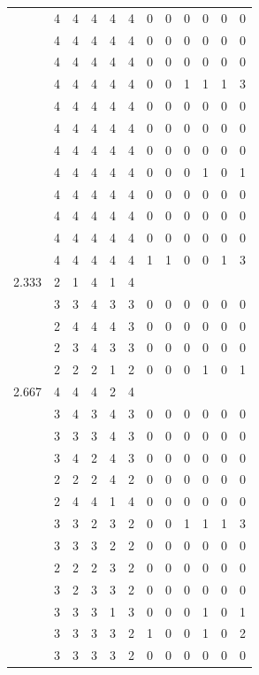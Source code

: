 \documentclass[]{msu-thesis}
\theoremstyle{definition}
\theoremstyle{definition}
\theoremstyle{definition}
\theoremstyle{remark}
\begin{document}
\begin{table}
{\begin{tabular}[t]{rrrrrrrrrrrr}
 & 4 & 4 & 4 & 4 & 4 & 0 & 0 & 0 & 0 & 0 & 0\\
 & 4 & 4 & 4 & 4 & 4 & 0 & 0 & 0 & 0 & 0 & 0\\
 & 4 & 4 & 4 & 4 & 4 & 0 & 0 & 0 & 0 & 0 & 0\\
 & 4 & 4 & 4 & 4 & 4 & 0 & 0 & 1 & 1 & 1 & 3\\
 & 4 & 4 & 4 & 4 & 4 & 0 & 0 & 0 & 0 & 0 & 0\\
 & 4 & 4 & 4 & 4 & 4 & 0 & 0 & 0 & 0 & 0 & 0\\
 & 4 & 4 & 4 & 4 & 4 & 0 & 0 & 0 & 0 & 0 & 0\\
 & 4 & 4 & 4 & 4 & 4 & 0 & 0 & 0 & 1 & 0 & 1\\
 & 4 & 4 & 4 & 4 & 4 & 0 & 0 & 0 & 0 & 0 & 0\\
 & 4 & 4 & 4 & 4 & 4 & 0 & 0 & 0 & 0 & 0 & 0\\
 & 4 & 4 & 4 & 4 & 4 & 0 & 0 & 0 & 0 & 0 & 0\\
 & 4 & 4 & 4 & 4 & 4 & 1 & 1 & 0 & 0 & 1 & 3\\
2.333 & 2 & 1 & 4 & 1 & 4 &  &  &  &  &  & \\
 & 3 & 3 & 4 & 3 & 3 & 0 & 0 & 0 & 0 & 0 & 0\\
 & 2 & 4 & 4 & 4 & 3 & 0 & 0 & 0 & 0 & 0 & 0\\
 & 2 & 3 & 4 & 3 & 3 & 0 & 0 & 0 & 0 & 0 & 0\\
 & 2 & 2 & 2 & 1 & 2 & 0 & 0 & 0 & 1 & 0 & 1\\
2.667 & 4 & 4 & 4 & 2 & 4 &  &  &  &  &  & \\
 & 3 & 4 & 3 & 4 & 3 & 0 & 0 & 0 & 0 & 0 & 0\\
 & 3 & 3 & 3 & 4 & 3 & 0 & 0 & 0 & 0 & 0 & 0\\
 & 3 & 4 & 2 & 4 & 3 & 0 & 0 & 0 & 0 & 0 & 0\\
 & 2 & 2 & 2 & 4 & 2 & 0 & 0 & 0 & 0 & 0 & 0\\
 & 2 & 4 & 4 & 1 & 4 & 0 & 0 & 0 & 0 & 0 & 0\\
 & 3 & 3 & 2 & 3 & 2 & 0 & 0 & 1 & 1 & 1 & 3\\
 & 3 & 3 & 3 & 2 & 2 & 0 & 0 & 0 & 0 & 0 & 0\\
 & 2 & 2 & 2 & 3 & 2 & 0 & 0 & 0 & 0 & 0 & 0\\
 & 3 & 2 & 3 & 3 & 2 & 0 & 0 & 0 & 0 & 0 & 0\\
 & 3 & 3 & 3 & 1 & 3 & 0 & 0 & 0 & 1 & 0 & 1\\
 & 3 & 3 & 3 & 3 & 2 & 1 & 0 & 0 & 1 & 0 & 2\\
 & 3 & 3 & 3 & 3 & 2 & 0 & 0 & 0 & 0 & 0 & 0\\

\end{tabular}}
\end{table}
\end{document}
